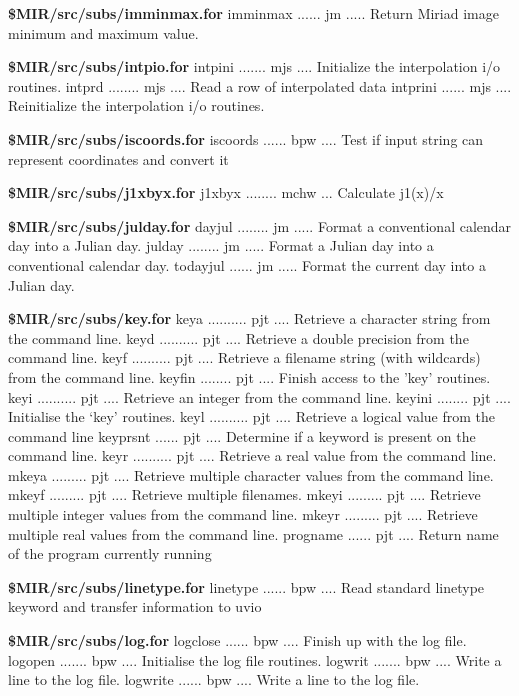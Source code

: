 \par{\bf \$MIR/src/subs/imminmax.for}
{\eightpoint\begintt
imminmax ...... jm ..... Return Miriad image minimum and maximum value.
\endtt}
\par{\bf \$MIR/src/subs/intpio.for}
{\eightpoint\begintt
intpini ....... mjs .... Initialize the interpolation i/o routines.
intprd ........ mjs .... Read a row of interpolated data
intprini ...... mjs .... Reinitialize the interpolation i/o routines.
\endtt}
\par{\bf \$MIR/src/subs/iscoords.for}
{\eightpoint\begintt
iscoords ...... bpw .... Test if input string can represent coordinates and convert it
\endtt}
\par{\bf \$MIR/src/subs/j1xbyx.for}
{\eightpoint\begintt
j1xbyx ........ mchw ... Calculate j1(x)/x
\endtt}
\par{\bf \$MIR/src/subs/julday.for}
{\eightpoint\begintt
dayjul ........ jm ..... Format a conventional calendar day into a Julian day.
julday ........ jm ..... Format a Julian day into a conventional calendar day.
todayjul ...... jm ..... Format the current day into a Julian day.
\endtt}
\par{\bf \$MIR/src/subs/key.for}
{\eightpoint\begintt
keya .......... pjt .... Retrieve a character string from the command line.
keyd .......... pjt .... Retrieve a double precision from the command line.
keyf .......... pjt .... Retrieve a filename string (with wildcards) from the command line.
keyfin ........ pjt .... Finish access to the 'key' routines.
keyi .......... pjt .... Retrieve an integer from the command line.
\endtt}
{\eightpoint\begintt
keyini ........ pjt .... Initialise the `key' routines.
keyl .......... pjt .... Retrieve a logical value from the command line
keyprsnt ...... pjt .... Determine if a keyword is present on the command line.
keyr .......... pjt .... Retrieve a real value from the command line.
mkeya ......... pjt .... Retrieve multiple character values from the command line.
\endtt}
{\eightpoint\begintt
mkeyf ......... pjt .... Retrieve multiple filenames.
mkeyi ......... pjt .... Retrieve multiple integer values from the command line.
mkeyr ......... pjt .... Retrieve multiple real values from the command line.
progname ...... pjt .... Return name of the program currently running
\endtt}
\par{\bf \$MIR/src/subs/linetype.for}
{\eightpoint\begintt
linetype ...... bpw .... Read standard linetype keyword and transfer information to uvio
\endtt}
\par{\bf \$MIR/src/subs/log.for}
{\eightpoint\begintt
logclose ...... bpw .... Finish up with the log file.
logopen ....... bpw .... Initialise the log file routines.
logwrit ....... bpw .... Write a line to the log file.
logwrite ...... bpw .... Write a line to the log file.
\endtt}
